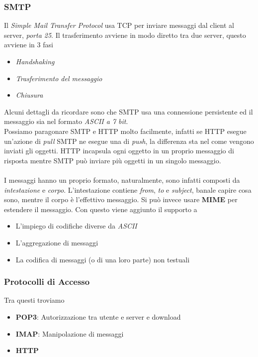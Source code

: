 \documentclass{article}
\begin{document}
            \subsubsection{SMTP}
                Il \textit{Simple Mail Transfer Protocol} usa TCP per inviare messaggi dal client al server, \textit{porta 25}. Il trasferimento avviene in modo diretto tra due server, questo avviene in 3 fasi
                \begin{itemize}
                    \item \textit{Handshaking}
                    \item \textit{Trasferimento del messaggio}
                    \item \textit{Chiusura} 
                \end{itemize}
                Alcuni dettagli da ricordare sono che SMTP usa una connessione persistente ed il messaggio sia nel formato \textit{ASCII a 7 bit}.\\
                Possiamo paragonare SMTP e HTTP molto facilmente, infatti se HTTP esegue un'azione di \textit{pull} SMTP ne esegue una di \textit{push}, la differenza sta nel come vengono inviati gli oggetti. HTTP incapsula ogni oggetto in un proprio messaggio di risposta mentre SMTP può inviare più oggetti in un singolo messaggio.\\
                \\
                I messaggi hanno un proprio formato, naturalmente, sono infatti composti da \textit{intestazione} e \textit{corpo}. L'intestazione contiene \textit{from}, \textit{to} e \textit{subject}, banale capire cosa sono, mentre il corpo è l'effettivo messaggio. Si può invece usare \textbf{MIME} per estendere il messaggio. Con questo viene aggiunto il supporto a
                \begin{itemize}
                    \item L'impiego di codifiche diverse da \textit{ASCII}
                    \item L'aggregazione di messaggi
                    \item La codifica di messaggi (o di una loro parte) non testuali
                \end{itemize}

            \subsubsection{Protocolli di Accesso}
                Tra questi troviamo
                \begin{itemize}
                    \item \textbf{POP3}: Autorizzazione tra utente e server e download
                    \item \textbf{IMAP}: Manipolazione di messaggi
                    \item \textbf{HTTP}
                \end{itemize}
\end{document}
